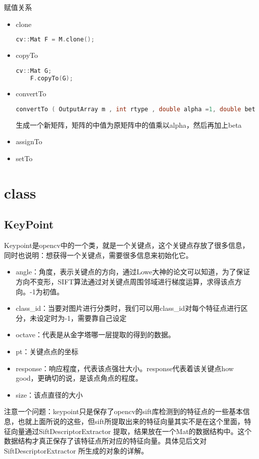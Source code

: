 \documentclass[12pt]{article}
\begin{document}
赋值关系
\begin{itemize}
\item clone
	\begin{lstlisting}[language=c++]
	cv::Mat F = M.clone(); 
	\end{lstlisting}
\item copyTo
	\begin{lstlisting}[language=c++]
	cv::Mat G; 
	F.copyTo(G); 
	\end{lstlisting}
\item convertTo
	\begin{lstlisting}[language=c++]
	convertTo ( OutputArray m , int rtype , double alpha =1, double beta =0 )
	\end{lstlisting}
	生成一个新矩阵，矩阵的中值为原矩阵中的值乘以alpha，然后再加上beta
\item assignTo
\item setTo
\end{itemize}



\section{class}

\subsection{KeyPoint}
Keypoint是opencv中的一个类，就是一个关键点，这个关键点存放了很多信息，同时也说明：想获得一个关键点，需要很多信息来初始化它。
\begin{itemize}
\item angle：角度，表示关键点的方向，通过Lowe大神的论文可以知道，为了保证方向不变形，SIFT算法通过对关键点周围邻域进行梯度运算，求得该点方向。-1为初值。
\item class\_id：当要对图片进行分类时，我们可以用class\_id对每个特征点进行区分，未设定时为-1，需要靠自己设定
\item octave：代表是从金字塔哪一层提取的得到的数据。
\item pt：关键点点的坐标
\item response：响应程度，代表该点强壮大小。response代表着该关键点how good，更确切的说，是该点角点的程度。
\item size：该点直径的大小
\end{itemize}

注意一个问题：keypoint只是保存了opencv的sift库检测到的特征点的一些基本信息，也就上面所说的这些，但sift所提取出来的特征向量其实不是在这个里面，特征向量通过SiftDescriptorExtractor 提取，结果放在一个Mat的数据结构中。这个数据结构才真正保存了该特征点所对应的特征向量。具体见后文对SiftDescriptorExtractor 所生成的对象的详解。
\end{document}
